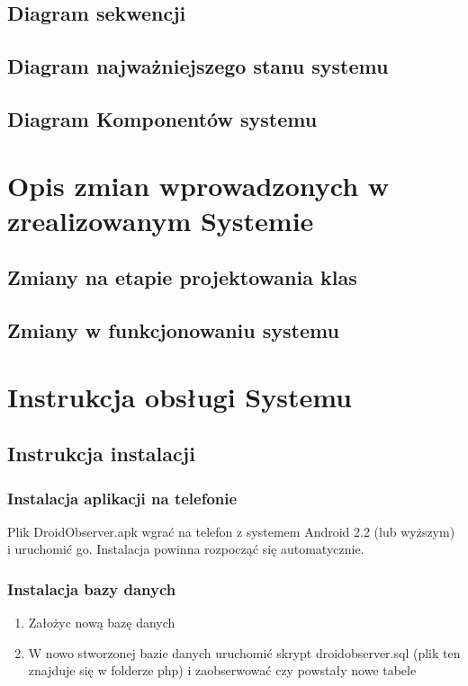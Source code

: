 \documentclass[11pt,a4paper]{article}
\begin{document}
\subsection {Diagram sekwencji}
\subsection {Diagram najważniejszego stanu systemu}
\subsection {Diagram Komponentów systemu}

\section {Opis zmian wprowadzonych w zrealizowanym Systemie }
\subsection {Zmiany na etapie projektowania klas}
\subsection {Zmiany w funkcjonowaniu systemu}

\newpage
\section {Instrukcja obsługi Systemu}
\subsection{Instrukcja instalacji}

\subsubsection{Instalacja aplikacji na telefonie}
Plik DroidObserver.apk wgrać na telefon z systemem Android 2.2 (lub wyższym) i uruchomić go.
Instalacja powinna rozpocząć się automatycznie.

\subsubsection{Instalacja bazy danych}
\begin{enumerate}
\item Założyc nową bazę danych
\item W nowo stworzonej bazie danych uruchomić skrypt droidobserver.sql (plik ten znajduje się w folderze php) i zaobserwować czy powstały nowe tabele
\end{enumerate}
\end{document}
